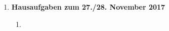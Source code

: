 \documentclass[11pt, a4paper]{article}
\begin{document}
\begin{enumerate}[\bfseries A:]
\begin{enumerate}[\bfseries 1.]
\begin{enumerate}[(i)]
\end{enumerate}

%

\end{enumerate}


\item \textbf{Hausaufgaben zum 27./28. November 2017}

\begin{enumerate}[\bfseries 1.]

\item \begin{enumerate}[a)]


\end{enumerate}
\end{enumerate}
\end{enumerate}
\end{document}
